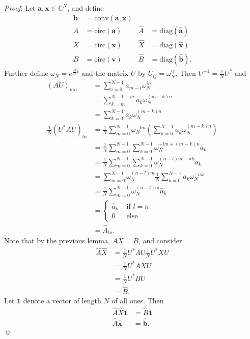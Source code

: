 \documentclass[12pt]{article}
\renewenvironment{proof}{\hspace{-4 ex} \emph{Proof}:}{\qed}
\newcommand{\CC}{\mathbb{C}}
\renewcommand{\vec}[1]{\boldsymbol{\mathbf{#1}}}
\begin{document}
\begin{proof}
	Let $\vec{a}, \vec{x} \in \CC^N$, and define
	\begin{align*}
		\vec{b} &= \text{conv}(\vec{a},\vec{x}) &&\\
		A &= \text{circ}(\vec{a}) & \hat{A} &= \text{diag}(\hat{\vec{a}}) \\
		X &= \text{circ}(\vec{x}) & \hat{X} &= \text{diag}(\hat{\vec{x}}) \\
		B &= \text{circ}(\vec{v}) & \hat{B} &= \text{diag}(\hat{\vec{b}}) \text{.}
	\end{align*}
	Further define $\omega_N = e^{\frac{2\pi}{N}\mathbf{i}}$ and the matrix $U$ by $U_{ij} = \omega_N^{ij}$. Then $U^{-1} = \frac{1}{N}U^{*}$ and 
	\begin{align*}
	(AU)_{mn} &= \sum\limits_{i=0}^{N-1}a_{m-i}\omega_N^{in} \\
	&= \sum\limits_{k=m}^{N-1+m}a_{k}\omega_N^{(m-k)n} \\
	&= \sum\limits_{k=0}^{N-1}a_{k}\omega_N^{(m-k)n} \\
	\frac{1}{N}(U^{*}AU)_{ln} &= \frac{1}{N} \sum\limits_{m=0}^{N-1} \omega_N^{-lm} \left( \sum\limits_{k=0}^{N-1}a_{k}\omega_N^{(m-k)n} \right) \\
	&= \frac{1}{N} \sum\limits_{m=0}^{N-1}\sum\limits_{k=0}^{N-1} \omega_N^{-lm + (m-k)n} a_{k} \\
	&= \frac{1}{N} \sum\limits_{m=0}^{N-1}\sum\limits_{k=0}^{N-1} \omega_N^{(n-l)m -nk} a_{k} \\
	&= \sum\limits_{m=0}^{N-1} \omega_N^{(n-l)m} \frac{1}{N} \sum\limits_{k=0}^{N-1} a_{k}\omega_N^{-nk}  \\
	& = \frac{1}{N}\sum\limits_{m=0}^{N-1} \omega_N^{(n-l)m} \hat{a}_k \\
	& = \begin{cases}
			\hat{a}_k & \text{ if } l=n \\
					0 & \text{ else}
		\end{cases} \\
	&= \hat{A}_{ln} \text{.}
	\end{align*}
	Note that by the previous lemma, $AX = B$, and consider
	\begin{align*}
		\hat{A}\hat{X} & = \frac{1}{N}U^{*}AU \frac{1}{N}U^{*}XU \\
		& = \frac{1}{N}U^{*}AXU \\
		& = \frac{1}{N}U^{*}BU \\
		& = \hat{B} \text{.}
	\end{align*}
	Let $\vec{1}$ denote a vector of length $N$ of all ones. Then
	\begin{align*}
	\hat{A}\hat{X} \vec{1} &= \hat{B} \vec{1} \\
	\hat{A}\hat{\vec{x}} &= \hat{\vec{b}} \text{.}
	\end{align*}
\end{proof}
\bigbreak
\end{document}
